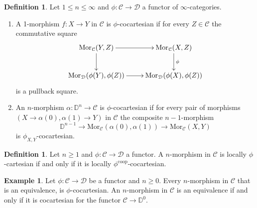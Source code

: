\documentclass[10pt,oneside]{article}
\numberwithin{equation}{section} %
\numberwithin{figure}{section} %
\theoremstyle{plain}
\theoremstyle{definition}
\newtheorem{definition}[theorem]{Definition}
\newtheorem{example}[theorem]{Example}
\newcommand{\bD}{{\mathbb D}}
\newcommand{\mC}{{\mathcal C}}
\newcommand{\mD}{{\mathcal D}}
\newcommand{\n}{{n}}
\newcommand{\op}{\mathrm{op}}
\newcommand{\co}{\mathrm{co}}
\newcommand{\Mor}{{\mathrm{Mor}}}
\begin{document}
\begin{definition}Let $1 \leq \n \leq \infty$ and $\phi: \mC \to \mD$ a functor of $\infty$-categories.

\begin{enumerate}[\normalfont(1)]\setlength{\itemsep}{-2pt}

\item A 1-morphism $f: X \to Y$ in $\mC$ is $\phi$-cocartesian if for every $Z\in \mC$ the commutative square 
\begin{equation}\label{filler1.1}
\begin{xy}
\xymatrix{
\Mor_\mC(Y,Z) \ar[d] \ar[r]
& \Mor_\mC(X,Z) \ar[d]^\phi
\\ 
\Mor_\mD(\phi(Y), \phi(Z)) \ar[r] & \Mor_\mD(\phi(X), \phi(Z))
}
\end{xy}\end{equation}
is a pullback square.


\item An $n$-morphism $\alpha:\bD^n\to\mC$ is $\phi$-cocartesian if
for every pair of morphisms $(X \to \alpha(0), \alpha(1) \to Y)$ in $\mC$ the composite $n-1$-morphism
\[
\bD^{n-1}\to\Mor_\mC(\alpha(0),\alpha(1)) \to \Mor_\mC(X,Y)
\]
is $\phi_{X,Y}$-cocartesian.
\end{enumerate}
\end{definition}

\begin{definition}Let $\n \geq 1$ and $\phi: \mC \to \mD$ a functor.
A $n$-morphism in $\mC$ is locally $\phi$-cartesian if and only if
it is locally $\phi^{\co\op}$-cocartesian.
    
\end{definition}

\begin{example}Let $\phi: \mC \to \mD$ be a functor and $n \geq 0$.
Every $n$-morphism in $\mC$ that is an equivalence, is $\phi$-cocartesian.
An $n$-morphism in $\mC$ is an equivalence if and only if it is 
cocartesian for the functor $\mC \to \bD^0$.
    
\end{example}
\end{document}
